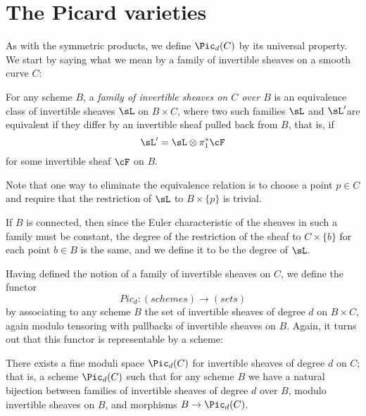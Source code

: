 
\section{The Picard varieties}

As with the symmetric products, we define $\Pic_d(C)$ by its universal property. We start by saying what we mean by a family of invertible sheaves on a smooth curve $C$:

\begin{definition}
 For any scheme $B$, a \emph{family of invertible sheaves on $C$ over $B$} is an equivalence class of invertible sheaves $\sL$ on $B\times C$, where two such
 families $\sL$ and $\sL'$are equivalent if they differ by an invertible sheaf pulled back from $B$, that is, if
 $$
 \sL' = \sL \otimes \pi_1^*\cF
 $$
for some invertible sheaf $\cF$ on $B$.
 \end{definition}

Note that one way to eliminate the equivalence relation is to choose a point $p \in C$ and require that the restriction of $\sL$ to $B \times \{p\}$ is trivial.
 
 
 If $B$ is connected, then since the Euler characteristic of the sheaves in such a family must be constant, the degree of the restriction of 
 the sheaf to $C\times \{b\}$ for each point $b\in B$ is the same, and we define it to be the degree of $\sL$. 
 
 Having defined the notion of a family of invertible sheaves on $C$, we define the functor
 $$
 Pic_d : (schemes) \to (sets)
 $$
 by associating to any scheme $B$ the set of invertible sheaves of degree $d$ on $B \times C$, again modulo tensoring with pullbacks of invertible sheaves on $B$. Again, it turns out that this functor is representable by a scheme:
  
 \begin{fact}\cite[Theorem 9.4.8]{Kleiman-PicardScheme}
 There exists a fine moduli space $\Pic_d(C)$ for invertible sheaves of degree $d$ on $C$; that is, a scheme $\Pic_d(C)$ such that for any scheme $B$ we have a natural bijection between families of invertible sheaves of degree $d$ over $B$, modulo invertible sheaves on $B$, and morphisms $B \to \Pic_d(C)$.
 \end{fact}
 
